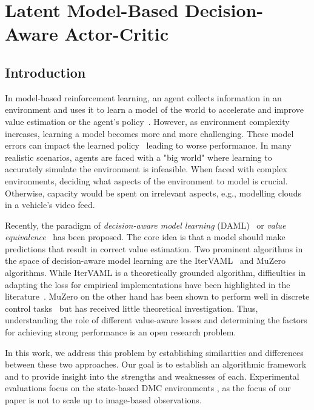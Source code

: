 \chapter{Latent Model-Based Decision-Aware Actor-Critic}

\newcommand{\rev}[1]{#1}

\section{Introduction}
In model-based reinforcement learning, an agent collects information in an environment and uses it to learn a model of the world to accelerate and improve value estimation or the agent's policy~\parencite{dyna,deisenroth2011pilco, Hafner2020Dream,schrittwieser2020mastering}.
However, as environment complexity increases, learning a model becomes more and more challenging. 
These model errors can impact the learned policy~\parencite{schneider1997exploiting,kearns2002near,talvitie2017self,lambert202objective} leading to worse performance.
In many realistic scenarios, agents are faced with a "big world" where learning to accurately simulate the environment is infeasible.
When faced with complex environments, deciding what aspects of the environment to model is crucial.
Otherwise, capacity would be spent on irrelevant aspects, e.g., modelling clouds in a vehicle's video feed.

Recently, the paradigm of \emph{decision-aware model learning} (DAML)~\parencite{vaml} or \emph{value equivalence}~\parencite{grimm2020value,grimm2021proper} has been proposed.
The core idea is that a model should make predictions that result in correct value estimation.
Two prominent algorithms in the space of decision-aware model learning are the IterVAML~\parencite{itervaml} and MuZero~\parencite{schrittwieser2020mastering} algorithms.
While IterVAML is a theoretically grounded algorithm, difficulties in adapting the loss for empirical implementations have been highlighted in the literature~\parencite{lovatto2020decision,voelcker2022value}.
MuZero on the other hand has been shown to perform well in discrete control tasks~\parencite{schrittwieser2020mastering,ye2021mastering} but has received little theoretical investigation. Thus, understanding the role of different value-aware losses and determining the factors for achieving strong performance is an open research problem.

In this work, we address this problem by establishing similarities and differences between these two approaches. 
Our goal is to establish an algorithmic framework and to provide insight into the strengths and weaknesses of each.
Experimental evaluations focus on the state-based DMC environments \parencite{tunyasuvunakool2020}, as the focus of our paper is not to scale up to image-based observations.

